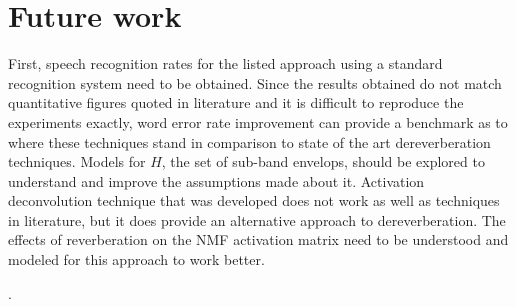 \documentclass[12pt, a4paper, oneside]{book}
\begin{document}
\section{Future work}
First, speech recognition rates for the listed approach using a standard recognition system need to be obtained. Since the results obtained do not match quantitative figures quoted in literature and it is difficult to reproduce the experiments exactly, word error rate improvement can provide a benchmark as to where these techniques stand in comparison to state of the art dereverberation techniques. Models for $H$, the set of sub-band envelops, should be explored to understand and improve the assumptions made about it. 
Activation deconvolution technique that was developed does not work as well as techniques in literature, but it does provide an alternative approach to dereverberation. The effects of reverberation on the NMF activation matrix need to be understood and modeled  for this approach to work better.





   .

\appendix %

% 

\backmatter


\end{document}
